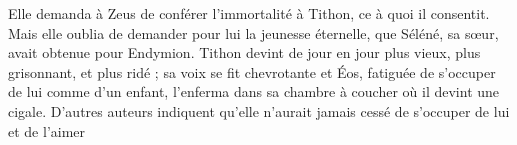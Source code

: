 \documentclass[12pt]{article}
\begin{document}
\vspace{1cm}
Elle demanda à Zeus de conférer l'immortalité à Tithon, ce à quoi il consentit. Mais elle oublia de demander pour lui la jeunesse éternelle, que Séléné, sa sœur, avait obtenue pour Endymion. Tithon devint de jour en jour plus vieux, plus grisonnant, et plus ridé ; sa voix se fit chevrotante et Éos, fatiguée de s'occuper de lui comme d'un enfant, l'enferma dans sa chambre à coucher où il devint une cigale. D'autres auteurs indiquent qu'elle n'aurait jamais cessé de s'occuper de lui et de l'aimer
\end{document}
